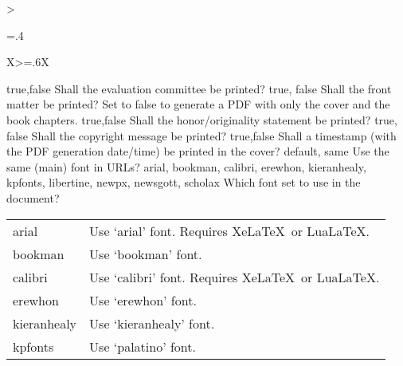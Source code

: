 \begin{xltabular}{\linewidth}{>{\hsize=.4\hsize\raggedright\arraybackslash}X>{\hsize=.6\hsize}X}
  {true,\newline false}%
  {Shall the evaluation committee be printed?}%
  {%
  }
  \midrule
  {true, \newline false}%
  {Shall the front matter be printed?}%
  {Set to false to generate a PDF with only the cover and the book chapters.}
  \midrule
  {true,\newline false }%
  {Shall the honor/originality statement be printed?}%
  {}
  \midrule
  {true, \newline false}%
  {Shall the copyright message be printed?}%
  {}
  \midrule
  {true,\newline false}%
  {Shall a timestamp (with the PDF generation date/time) be printed in the cover?}%
  {%
  }
  \midrule
  {default, \newline same}%
  {Use the same (main) font in URLs?}%
  {}
  \midrule
  {arial, bookman, calibri, erewhon, kieranhealy, kpfonts, libertine, newpx, newsgott, scholax}%
  {Which font set to use in the document?}%
  {%
    \begin{tabular}{@{}l@{ $\rightarrow$ }X@{}}
      arial       & Use `arial' font. Requires Xe\LaTeX\ or Lua\LaTeX.    \\
      bookman     & Use `bookman' font.                                   \\
      calibri     & Use `calibri' font. Requires Xe\LaTeX\ or Lua\LaTeX.  \\
      erewhon     & Use `erewhon' font.                                   \\
      kieranhealy & Use `kieranhealy' font.                               \\
      kpfonts     & Use `palatino' font.                                  \\

\end{tabular}}
\end{xltabular}
